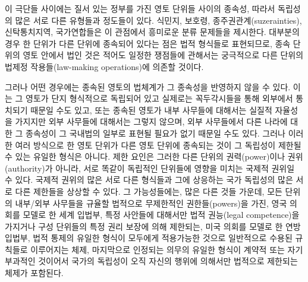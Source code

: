 이 극단들 사이에는 질서 있는 정부를 가진 영토 단위들 사이의 종속성,
따라서 독립성의 많은 서로 다른 유형들과 정도들이 있다. 식민지, 보호령,
종주권관계(suzerainties), 신탁통치지역, 국가연합들은 이 관점에서
흥미로운 분류 문제들을 제시한다. 대부분의 경우 한 단위가 다른 단위에
종속되어 있다는 점은 법적 형식들로 표현되므로, 종속 단위의 영토 안에서
법인 것은 적어도 일정한 쟁점들에 관해서는 궁극적으로 다른 단위의 법제정
작용들(law-making operations)에 의존할 것이다.

그러나 어떤 경우에는 종속된 영토의 법체계가 그 종속성을 반영하지 않을 수
있다. 이는 그 영토가 단지 형식적으로 독립되어 있고 실제로는 꼭두각시들을
통해 외부에서 통치되기 때문일 수도 있고, 또는 종속된 영토가 내부
사무들에 대해서는 실질적 자율성을 가지지만 외부 사무들에 대해서는 그렇지
않으며, 외부 사무들에서 다른 나라에 대한 그 종속성이 그 국내법의 일부로
표현될 필요가 없기 때문일 수도 있다. 그러나 이러한 여러 방식으로 한 영토
단위가 다른 영토 단위에 종속되는 것이 그 독립성이 제한될 수 있는 유일한
형식은 아니다. 제한 요인은 그러한 다른 단위의 권력(power)이나
권위(authority)가 아니라, 서로 똑같이 독립적인 단위들에 영향을 미치는
국제적 권위일 수 있다. 국제적 권위의 많은 서로 다른 형식들과 그에
상응하는 국가 독립성의 많은 서로 다른 제한들을 상상할 수 있다. 그
가능성들에는, 많은 다른 것들 가운데, 모든 단위의 내부/외부 사무들을
규율할 법적으로 무제한적인 권한들(powers)을 가진, 영국 의회를 모델로 한
세계 입법부, 특정 사안들에 대해서만 법적 권능(legal competence)을
가지거나 구성 단위들의 특정 권리 보장에 의해 제한되는, 미국 의회를
모델로 한 연방 입법부, 법적 통제의 유일한 형식이 모두에게 적용가능한
것으로 일반적으로 수용된 규칙들로 이루어지는 체제, 마지막으로 인정되는
의무의 유일한 형식이 계약적 또는 자기부과적인 것이어서 국가의 독립성이
오직 자신의 행위에 의해서만 법적으로 제한되는 체제가 포함된다.

